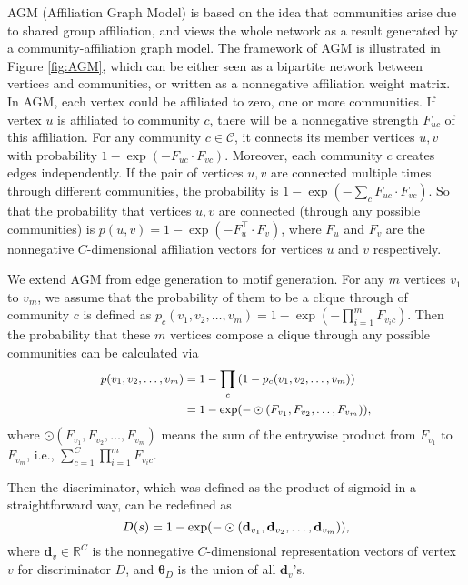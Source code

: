 \documentclass[sigconf]{acmart}
\begin{document}
AGM (Affiliation Graph Model) \cite{yang2012community,yang2013overlapping} is based on the idea that communities arise due to shared group affiliation, and views the whole network as a result generated by a community-affiliation graph model.
The framework of AGM is illustrated in Figure \ref{fig:AGM}, which can be either seen as a bipartite network between vertices and communities, or written as a nonnegative affiliation weight matrix.
In AGM, each vertex could be affiliated to zero, one or more communities.
If vertex $u$ is affiliated to community $c$, there will be a nonnegative strength $F_{uc}$ of this affiliation.
For any community $c \in \mathcal{C}$, it connects its member vertices $u, v$ with probability $1-\exp(-F_{uc} \cdot F_{vc})$.
Moreover, each community $c$ creates edges independently.
If the pair of vertices $u, v$ are connected multiple times through different communities, the probability is $1-\exp(-\sum_cF_{uc} \cdot F_{vc})$.
So that the probability that vertices $u, v$ are connected (through any possible communities) is $p(u,v) = 1-\exp(-F_{u}^\top  \cdot F_{v})$, where $F_u$ and $F_v$ are the nonnegative $C$-dimensional affiliation vectors for vertices $u$ and $v$ respectively.

We extend AGM from edge generation to motif generation.
For any $m$ vertices $v_1$ to $v_m$, we assume that the probability of them to be a clique through of community $c$ is defined as $p_c(v_1, v_2,\ldots , v_m) = 1 - \exp(-\prod_{i=1}^{m} F_{v_{i} c})$.
Then the probability that these $m$ vertices compose a clique through any possible communities can be calculated via
\begin{equation}
\label{eq:p-agm-clique}
\small
\begin{aligned}
  p(v_1, v_2,\ldots , v_m)  &= 1 - \prod_{c}{(1 - p_c(v_1, v_2,\ldots , v_m))}\\
              &= 1 - {\exp(-\odot(F_{v_1},F_{v_2},\ldots ,F_{v_m}))},\\
\end{aligned}
\end{equation}
where $\odot(F_{v_1},F_{v_2},\ldots ,F_{v_m})$ means the sum of the entrywise product from $F_{v_1}$ to $F_{v_m}$, i.e., $\sum_{c=1}^{C}\prod_{i=1}^{m}F_{v_ic}$.

Then the discriminator, which was defined as the product of sigmoid in a straightforward way, can be redefined as
\begin{equation}
\label{eq:d(s)-agm}
\small
  D(s)  = 1 - {\exp(-\odot(\mathbf{d}_{v_1},\mathbf{d}_{v_2},\ldots ,\mathbf{d}_{v_m}))},
\end{equation}
where $\mathbf{d}_v \in \mathbb{R}^C$ is the nonnegative $C$-dimensional representation vectors of vertex $v$ for discriminator $D$, and $\mathbf{\theta}_D$ is the union of all $\mathbf{d}_v$'s.
\end{document}
